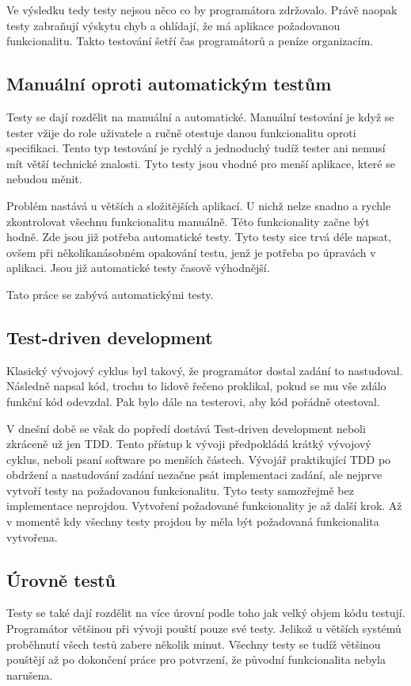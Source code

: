\documentclass[czech,master,public,dept460,male,cpdeclaration,twoside]{diploma}
\begin{document}
Ve výsledku tedy testy nejsou něco co by programátora zdržovalo. Právě naopak testy zabraňují výskytu chyb a ohlídají, že má aplikace požadovanou funkcionalitu. Takto testování šetří čas programátorů a peníze organizacím.

\subsection{Manuální oproti automatickým testům}
Testy se dají rozdělit na manuální a automatické. Manuální testování je když se tester vžije do role uživatele a ručně otestuje danou funkcionalitu oproti specifikaci. Tento typ testování je rychlý a jednoduchý tudíž tester ani nemusí mít větší technické znalosti. Tyto testy jsou vhodné pro menší aplikace, které se nebudou měnit.

Problém nastává u větších a složitějších aplikací. U nichž nelze snadno a rychle zkontrolovat všechnu funkcionalitu manuálně. Této funkcionality začne být hodně. Zde jsou již potřeba automatické testy. Tyto testy sice trvá déle napsat, ovšem při několikanásobném opakování testu, jenž je potřeba po úpravách v aplikaci. Jsou již automatické testy časově výhodnější.

Tato práce se zabývá automatickými testy.

\subsection{Test-driven development}
Klasický vývojový cyklus byl takový, že programátor dostal zadání to nastudoval. Následně napsal kód, trochu to lidově řečeno proklikal, pokud se mu vše zdálo funkční kód odevzdal. Pak bylo dále na testerovi, aby kód pořádně otestoval.

V dnešní době se však do popředí dostává Test-driven development neboli zkráceně už jen TDD. Tento přístup k vývoji předpokládá krátký vývojový cyklus, neboli psaní software po menších částech. Vývojář praktikující TDD po obdržení a nastudování zadání nezačne psát implementaci zadání, ale nejprve vytvoří testy na požadovanou funkcionalitu. Tyto testy samozřejmě bez implementace neprojdou. Vytvoření požadované funkcionality je až další krok. Až v momentě kdy všechny testy projdou by měla být požadovaná funkcionalita vytvořena.

\subsection{Úrovně testů}
Testy se také dají rozdělit na více úrovní podle toho jak velký objem kódu testují. Programátor většinou při vývoji pouští pouze své testy. Jelikož u větších systémů proběhnutí všech testů zabere několik minut. Všechny testy se tudíž většinou pouštějí až po dokončení práce pro potvrzení, že původní funkcionalita nebyla narušena.
\end{document}
